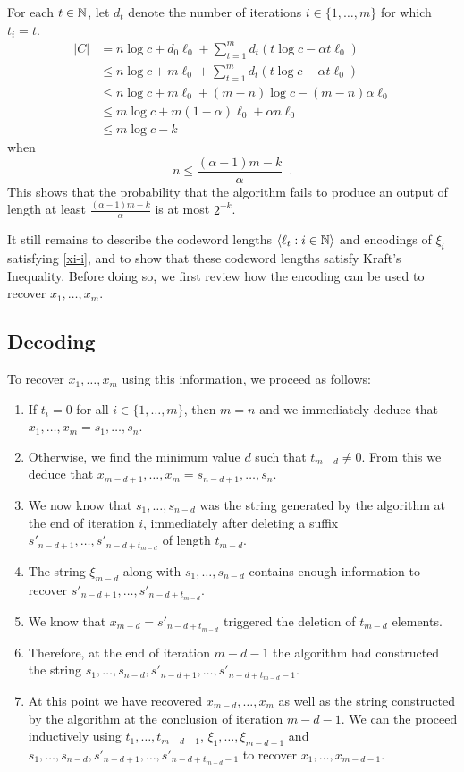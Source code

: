 \documentclass{patmorin}
\begin{document}

For each $t\in\mathbb{N}$, let $d_t$ denote the number of iterations $i\in\{1,\ldots,m\}$ for which $t_i=t$. 
\begin{align*}
    |C| 
    & = n\log c + d_0\ell_0 + \sum_{t=1}^m d_t\left(t\log c - \alpha t\ell_0\right) 
      \\
    & \le n\log c + m\ell_0 + \sum_{t=1}^m d_t\left(t\log c - \alpha t\ell_0\right) 
        \\
    & \le n\log c + m\ell_0 + (m-n)\log c - (m-n)\alpha\ell_0 \\
    & \le m\log c + m(1-\alpha)\ell_0 + \alpha n\ell_0 \\
    & \le m\log c - k
\end{align*}
when
\[   n \le \frac{(\alpha-1)m - k}{\alpha} \enspace . \]
This shows that the probability that the algorithm fails to produce an output of length at least $\frac{(\alpha-1)m - k}{\alpha}$ is at most $2^{-k}$.

It still remains to describe the codeword lengths $\langle \ell_t:i\in \mathbb{N}\rangle$ and encodings of $\xi_i$ satisfying \eqref{xi-i}, and to show that these codeword lengths satisfy Kraft's Inequality.  Before doing so, we first review how the encoding can be used to recover $x_1,\ldots,x_m$.


\subsection{Decoding}

To recover $x_1,\ldots,x_m$ using this information, we proceed as follows:
\begin{enumerate}
  \item If $t_i=0$ for all $i\in\{1,\ldots,m\}$, then $m=n$ and we immediately deduce that $x_1,\ldots,x_m=s_1,\ldots,s_n$.
  \item Otherwise, we find the minimum value $d$ such that $t_{m-d}\neq 0$.  
  From this we deduce that $x_{m-d+1},\ldots,x_m = s_{n-d+1},\ldots,s_n$.
  \item We now know that $s_1,\ldots,s_{n-d}$ was the string generated by the algorithm at the end of iteration $i$, immediately after deleting a suffix $s'_{n-d+1},\ldots,s'_{n-d+t_{m-d}}$ of length $t_{m-d}$.
  \item The string $\xi_{m-d}$ along with $s_1,\ldots,s_{n-d}$ contains enough information to recover $s'_{n-d+1},\ldots,s'_{n-d+t_{m-d}}$.
  \item We know that $x_{m-d} = s'_{n-d+t_{m-d}}$ triggered the deletion of $t_{m-d}$ elements.
  \item Therefore, at the end of iteration $m-d-1$ the algorithm had constructed the string $s_1,\ldots,s_{n-d},s'_{n-d+1},\ldots,s'_{n-d+t_{m-d}-1}$.
  \item At this point we have recovered $x_{m-d},\ldots,x_m$ as well as the string constructed by the algorithm at the conclusion of iteration $m-d-1$.  We can the proceed inductively using $t_1,\ldots,t_{m-d-1}$, $\xi_1,\ldots,\xi_{m-d-1}$ and $s_1,\ldots,s_{n-d},s'_{n-d+1},\ldots,s'_{n-d+t_{m-d}-1}$ to recover $x_1,\ldots,x_{m-d-1}$.
\end{enumerate}
\end{document}
